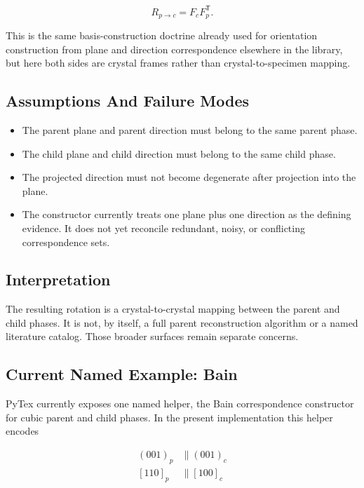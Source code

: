 \begin{equation}
R_{p \rightarrow c} = F_c F_p^\mathsf{T}.
\end{equation}

This is the same basis-construction doctrine already used for orientation construction from plane
and direction correspondence elsewhere in the library, but here both sides are crystal frames
rather than crystal-to-specimen mapping.

\subsection{Assumptions And Failure Modes}

\begin{itemize}
  \item The parent plane and parent direction must belong to the same parent phase.
  \item The child plane and child direction must belong to the same child phase.
  \item The projected direction must not become degenerate after projection into the plane.
  \item The constructor currently treats one plane plus one direction as the defining evidence. It
  does not yet reconcile redundant, noisy, or conflicting correspondence sets.
\end{itemize}

\subsection{Interpretation}

The resulting rotation is a crystal-to-crystal mapping between the parent and child phases. It is
not, by itself, a full parent reconstruction algorithm or a named literature catalog. Those broader
surfaces remain separate concerns.

\subsection{Current Named Example: Bain}

PyTex currently exposes one named helper, the Bain correspondence constructor for cubic parent and
child phases. In the present implementation this helper encodes

\begin{align}
(001)_p &\parallel (001)_c \\
[110]_p &\parallel [100]_c
\end{align}

